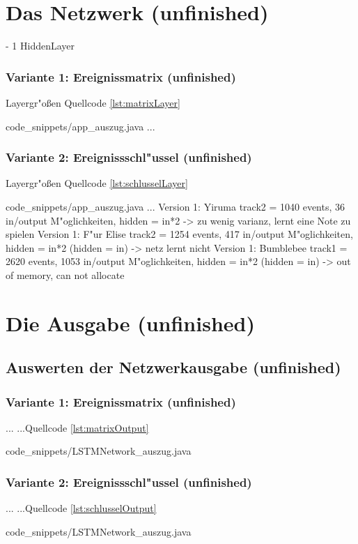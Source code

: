 {\section{Das Netzwerk (unfinished)}
- 1 HiddenLayer
\subsubsection{Variante 1: Ereignissmatrix (unfinished) }
Layergr"o{\ss}en
Quellcode \ref{lst:matrixLayer}

{code_snippets/app_auszug.java}
...

\subsubsection{Variante 2: Ereignissschl"ussel (unfinished) }
Layergr"o{\ss}en
Quellcode \ref{lst:schlusselLayer}

{code_snippets/app_auszug.java}
...
Version 1: Yiruma track2 = 1040 events, 36 in/output M"oglichkeiten, hidden = in*2 -> zu wenig varianz, lernt eine Note zu spielen
Version 1: F"ur Elise track2 = 1254 events, 417 in/output M"oglichkeiten, hidden = in*2 (hidden = in) -> netz lernt nicht
Version 1: Bumblebee track1 = 2620 events, 1053 in/output M"oglichkeiten, hidden = in*2 (hidden = in) -> out of memory, can not allocate




\section{Die Ausgabe (unfinished)}
\subsection{Auswerten der Netzwerkausgabe (unfinished)}
\subsubsection{Variante 1: Ereignissmatrix (unfinished)}
...
...Quellcode \ref{lst:matrixOutput}

{code_snippets/LSTMNetwork_auszug.java}

\subsubsection{Variante 2: Ereignissschl"ussel (unfinished)}
...
...Quellcode \ref{lst:schlusselOutput}

{code_snippets/LSTMNetwork_auszug.java}


}
